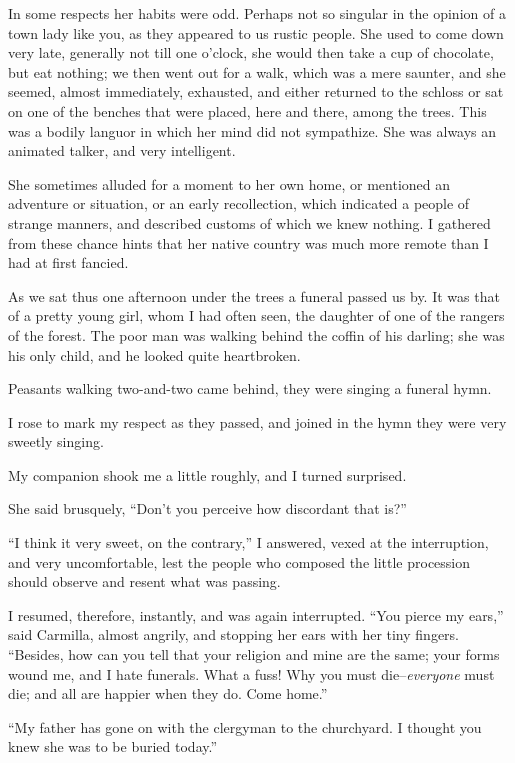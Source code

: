 \documentclass[11pt,twoside,makeidx,hidelinks,]{memoir}
\begin{document}
In some respects her habits were odd. Perhaps not so singular in the
opinion of a town lady like you, as they appeared to us rustic people.
She used to come down very late, generally not till one o'clock, she
would then take a cup of chocolate, but eat nothing; we then went out
for a walk, which was a mere saunter, and she seemed, almost
immediately, exhausted, and either returned to the schloss or sat on one
of the benches that were placed, here and there, among the trees. This
was a bodily languor in which her mind did not sympathize. She was
always an animated talker, and very intelligent.

She sometimes alluded for a moment to her own home, or mentioned an
adventure or situation, or an early recollection, which indicated a
people of strange manners, and described customs of which we knew
nothing. I gathered from these chance hints that her native country was
much more remote than I had at first fancied.

As we sat thus one afternoon under the trees a funeral passed us by. It
was that of a pretty young girl, whom I had often seen, the daughter of
one of the rangers of the forest. The poor man was walking behind the
coffin of his darling; she was his only child, and he looked quite
heartbroken.

Peasants walking two-and-two came behind, they were singing a funeral
hymn.

I rose to mark my respect as they passed, and joined in the hymn they
were very sweetly singing.

My companion shook me a little roughly, and I turned surprised.

She said brusquely, ``Don't you perceive how discordant that is?''

``I think it very sweet, on the contrary,'' I answered, vexed at the
interruption, and very uncomfortable, lest the people who composed the
little procession should observe and resent what was passing.

I resumed, therefore, instantly, and was again interrupted. ``You pierce
my ears,'' said Carmilla, almost angrily, and stopping her ears with her
tiny fingers. ``Besides, how can you tell that your religion and mine are
the same; your forms wound me, and I hate funerals. What a fuss! Why you
must die--\emph{everyone} must die; and all are happier when they do.
Come home.''

``My father has gone on with the clergyman to the churchyard. I thought
you knew she was to be buried today.''
\end{document}
